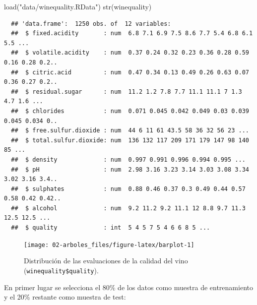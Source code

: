 \documentclass[
]{book}
\newenvironment{Shaded}{\begin{snugshade}}{\end{snugshade}}
\newcommand{\AttributeTok}[1]{\textcolor[rgb]{0.77,0.63,0.00}{#1}}
\newcommand{\FunctionTok}[1]{\textcolor[rgb]{0.00,0.00,0.00}{#1}}
\newcommand{\NormalTok}[1]{#1}
\newcommand{\SpecialCharTok}[1]{\textcolor[rgb]{0.00,0.00,0.00}{#1}}
\newcommand{\StringTok}[1]{\textcolor[rgb]{0.31,0.60,0.02}{#1}}
\theoremstyle{break}
\theoremstyle{nonumberplain}
\begin{document}
\begin{Shaded}
\begin{Highlighting}[]
\FunctionTok{load}\NormalTok{(}\StringTok{"data/winequality.RData"}\NormalTok{)}
\FunctionTok{str}\NormalTok{(winequality)}
\end{Highlighting}
\end{Shaded}

\begin{verbatim}
  ## 'data.frame':  1250 obs. of  12 variables:
  ##  $ fixed.acidity       : num  6.8 7.1 6.9 7.5 8.6 7.7 5.4 6.8 6.1 5.5 ...
  ##  $ volatile.acidity    : num  0.37 0.24 0.32 0.23 0.36 0.28 0.59 0.16 0.28 0.2..
  ##  $ citric.acid         : num  0.47 0.34 0.13 0.49 0.26 0.63 0.07 0.36 0.27 0.2..
  ##  $ residual.sugar      : num  11.2 1.2 7.8 7.7 11.1 11.1 7 1.3 4.7 1.6 ...
  ##  $ chlorides           : num  0.071 0.045 0.042 0.049 0.03 0.039 0.045 0.034 0..
  ##  $ free.sulfur.dioxide : num  44 6 11 61 43.5 58 36 32 56 23 ...
  ##  $ total.sulfur.dioxide: num  136 132 117 209 171 179 147 98 140 85 ...
  ##  $ density             : num  0.997 0.991 0.996 0.994 0.995 ...
  ##  $ pH                  : num  2.98 3.16 3.23 3.14 3.03 3.08 3.34 3.02 3.16 3.4..
  ##  $ sulphates           : num  0.88 0.46 0.37 0.3 0.49 0.44 0.57 0.58 0.42 0.42..
  ##  $ alcohol             : num  9.2 11.2 9.2 11.1 12 8.8 9.7 11.3 12.5 12.5 ...
  ##  $ quality             : int  5 4 5 7 5 4 6 6 8 5 ...
\end{verbatim}

\begin{Shaded}
\end{Shaded}

\begin{figure}[!htb]

{\centering \texttt{[image: 02-arboles\_files/figure-latex/barplot-1]} 

}

\caption{Distribución de las evaluaciones de la calidad del vino (\texttt{winequality\$quality}).}\label{fig:barplot}
\end{figure}

En primer lugar se selecciona el 80\% de los datos como muestra de entrenamiento y el 20\% restante como muestra de test:
\end{document}
